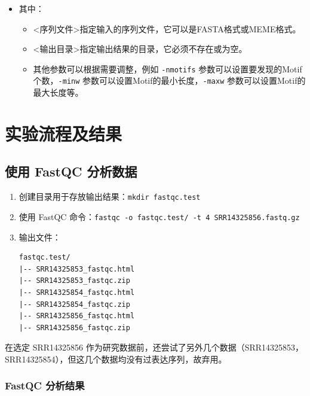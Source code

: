 \documentclass[UTF8]{ctexart}
\begin{document}
\begin{itemize}
	\item 其中：
	\begin{itemize}
		\item <序列文件>指定输入的序列文件，它可以是FASTA格式或MEME格式。
		\item <输出目录>指定输出结果的目录，它必须不存在或为空。
		\item 其他参数可以根据需要调整，例如 \verb|-nmotifs| 参数可以设置要发现的Motif个数，\verb|-minw| 参数可以设置Motif的最小长度，\verb|-maxw| 参数可以设置Motif的最大长度等。
	\end{itemize}
\end{itemize}

\section{实验流程及结果}

\subsection{使用 FastQC 分析数据}

\begin{enumerate}
	\item 创建目录用于存放输出结果：\verb|mkdir fastqc.test|
	\item 使用 FastQC 命令：\verb|fastqc -o fastqc.test/ -t 4 SRR14325856.fastq.gz |
	\item 输出文件：
	\begin{lstlisting}
fastqc.test/
|-- SRR14325853_fastqc.html
|-- SRR14325853_fastqc.zip
|-- SRR14325854_fastqc.html
|-- SRR14325854_fastqc.zip
|-- SRR14325856_fastqc.html
|-- SRR14325856_fastqc.zip
	\end{lstlisting}
\end{enumerate}

在选定 SRR14325856 作为研究数据前，还尝试了另外几个数据（SRR14325853，\\SRR14325854），但这几个数据均没有过表达序列，故弃用。

\subsubsection{FastQC 分析结果}

\clearpage
\end{document}
